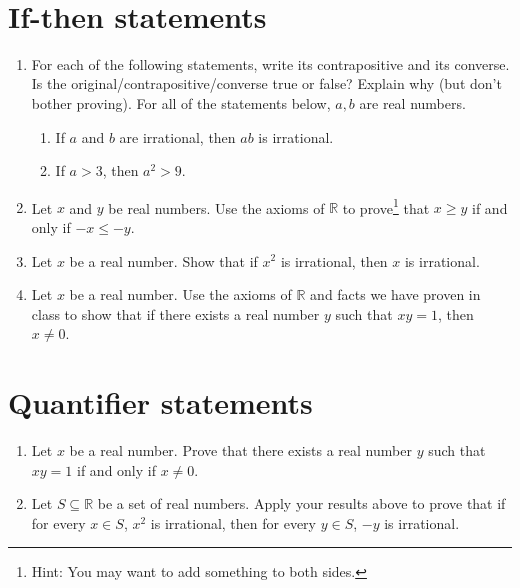 \documentclass[12pt]{amsart}
\newcommand{\R}{\mathbb{R}}
\begin{document}
	
	\thispagestyle{empty}
	
	\

\section*{If-then statements}

\begin{enumerate}
\item For each of the following statements, write its contrapositive and its converse. Is the original/contrapositive/converse true or false? Explain why (but don't bother proving). For all of the statements below, $a,b$ are real numbers.
\begin{enumerate}
\item If $a$ and $b$ are irrational, then $ab$ is irrational.
\item If $a>3$, then $a^2>9$.
\end{enumerate}
\item Let $x$ and $y$ be real numbers. Use the axioms of $\R$ to prove\footnote{Hint: You may want to add something to both sides.} that $x \geq y$ if and only if $-x\leq -y$.

\item Let $x$ be a real number. Show that if $x^2$ is irrational, then $x$ is irrational.
\item Let $x$ be a real number. Use the axioms of $\R$ and facts we have proven in class to show that if there exists a real number $y$ such that $xy=1$, then $x\neq 0$.
\end{enumerate}

\section*{Quantifier statements}

\begin{enumerate}
\item Let $x$ be a real number. Prove that there exists a real number $y$ such that $xy=1$ if and only if $x\neq 0$.
\item Let $S\subseteq \R$ be a set of real numbers. Apply your results above to prove that if for every $x\in S$, $x^2$ is irrational, then for every $y\in S$, $-y$ is irrational.

\end{enumerate}
\end{document}
